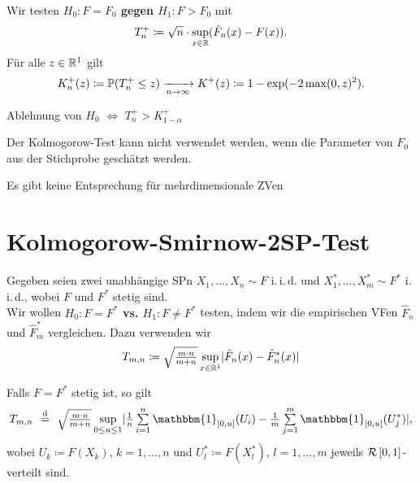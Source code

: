 \documentclass{cheat-sheet}
\renewcommand{\P}{\mathbb{P}} %
\newcommand{\ind}{\mathbbm{1}} %
\DeclareMathOperator*{\eqqd}{\stackrel{d}{=}} %
\newcommand{\iid}{i.\,i.\,d.} %
\newcommand{\Uniform}{\mathcal{R}} %
\newcommand{\testh}[1]{\textcolor{TestColor}{\textbf{#1}}}
\begin{document}
\begin{test} \mbox{}\\
  Wir testen \testh{$H_0 : F = F_0$ gegen $H_1 : F > F_0$} mit %
  \[ T_n^{+} \coloneqq \sqrt{n} \cdot \sup_{x \in \mathbb{R}} (\hat{F}_n(x) - F(x)). \]
  Für alle $z \in \mathbb{R}^1$ gilt
  \[ K_n^{+}(z) \coloneqq \P(T_n^{+} \leq z) \xra[n \to \infty]{} K^{+}(z) \coloneqq 1 - \exp(-2 \max(0, z)^2). \]
\end{test}

\begin{entscheidungsregel}
  Ablehnung von $H_0$ $\iff$ $T_n^{+} > K^+_{1-\alpha}$
\end{entscheidungsregel}

\begin{acht}
  Der Kolmogorow-Test kann nicht verwendet werden, wenn die Parameter von $F_0$ aus der Stichprobe geschätzt werden.
\end{acht}

\begin{bem}
  Es gibt keine Entsprechung für mehrdimensionale ZVen
\end{bem}

\section{Kolmogorow-Smirnow-2SP-Test}

\begin{situation}
  Gegeben seien zwei unabhängige SPn $X_1, \ldots, X_n \sim F$ \iid{} und $X_1^*, \ldots, X_m^* \sim F^*$ \iid{}, wobei $F$ und $F^*$ stetig sind. \\
  Wir wollen \testh{$H_0 : F = F^*$ vs. $H_1 : F \neq F^*$} testen, indem wir die empirischen VFen $\hat{F}_n$ und $\hat{F}_m^*$ vergleichen.
  Dazu verwenden wir
  \[ T_{m,n} \coloneqq \sqrt{\tfrac{m \cdot n}{m + n}} \sup_{x \in \mathbb{R}^1} \lvert\hat{F}_n(x) - \hat{F}_n^*(x)\rvert \]
\end{situation}

\begin{satz}
  Falls $F = F^*$ stetig ist, so gilt
  \[ T_{m,n} \enspace\eqqd\enspace \sqrt{\tfrac{m \cdot n}{m + n}} \sup_{0 \leq u \leq 1} \abs{\tfrac{1}{n} \sum_{i=1}^n \ind_{\cinterval{0}{u}} (U_i) - \tfrac{1}{m} \sum_{j=1}^m \ind_{\cinterval{0}{u}} (U_j^*)}, \]
  wobei $U_k \coloneqq F(X_k)$, $k = 1, \ldots, n$ und $U^*_l \coloneqq F(X^*_l)$, $l = 1, \ldots, m$ jeweils $\Uniform \cinterval{0}{1}$-verteilt sind.
  \iffalse
  wobei $X_i \eqqd F^{-}(U_i)$, $i = 1, \ldots, n$, \enspace
  $X_j^* \eqqd F^{*,-}(U_j^*)$, $j = 1, \ldots, m$ und
  \[
    F^{-}(t) \coloneqq \begin{cases}
      \min \Set{x \in \R^1}{F(x) \geq t} & 0 < t \leq 1, \\
      \lim_{t \downarrow 0} F^{-}(t) & t = 0.
    \end{cases}
    \tag{Quantilfunktion}
  \]
  \fi
\end{satz}
\end{document}
